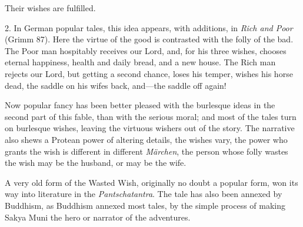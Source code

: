 \documentclass[14pt,a4paper]{memoir}
\begin{document}
Their wishes are fulfilled.

2. In German popular tales, this idea appears, with additions, in
\emph{Rich and Poor} (Grimm 87). Here the virtue of the good is
contrasted with the folly of the bad. The Poor man hospitably receives
our Lord, and, for his three wishes, chooses eternal happiness, health
and daily bread, and a new house. The Rich man rejects our Lord, but
getting a second chance, loses his temper, wishes his horse dead, the
saddle on his wife\textquotesingle s back, and---the saddle off again!

Now popular fancy has been better pleased with the burlesque ideas in
the second part of this fable, than with the serious moral; and most of
the tales turn on burlesque wishes, leaving the virtuous wishers out of
the story. The narrative also shews a Protean power of altering details,
the wishes vary, the power who grants the wish is different in different
\emph{Märchen}, the person whose folly wastes the wish may be the
husband, or may be the wife.

A very old form of the Wasted Wish, originally no doubt a popular form,
won its way into literature in the \emph{Pantschatantra}. The tale has
also been annexed by Buddhism, as Buddhism annexed most tales, by the
simple process of making Sakya Muni the hero or narrator of the
adventures.
\end{document}
